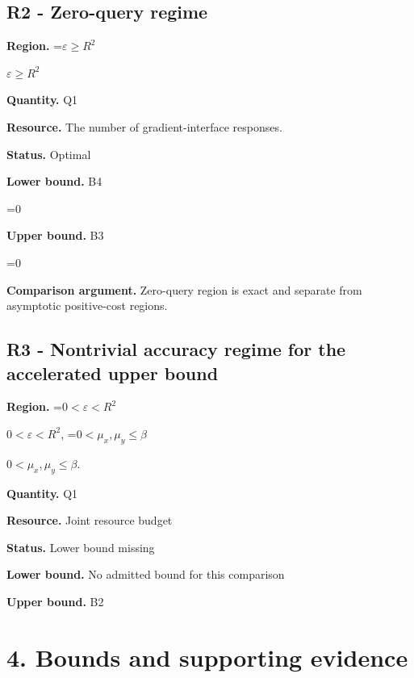 \documentclass[10pt,a4paper]{article}
\newcommand{\AtlasMath}[1]{\par\begingroup\centering\setbox0=\hbox{$\displaystyle #1$}\ifdim\wd0>1.4\linewidth\typeout{ATLAS WIDE FORMULA: \the\wd0}\fi\ifdim\wd0>\linewidth\resizebox{\linewidth}{!}{\box0}\else\box0\fi\par\endgroup}
\newcommand{\AtlasInlineMath}[1]{\begingroup\setbox0=\hbox{$#1$}\ifdim\wd0>.4\linewidth\endgroup\AtlasMath{#1}\else\endgroup$#1$\fi}
\begin{document}
\subsection{R2 - Zero-query regime}


\textbf{Region.} \AtlasInlineMath{\varepsilon\ge R^2}



\textbf{Quantity.} Q1



\textbf{Resource.} The number of gradient-interface responses.



\textbf{Status.} Optimal



\textbf{Lower bound.} B4



\AtlasMath{0}


\textbf{Upper bound.} B3



\AtlasMath{0}


\textbf{Comparison argument.} Zero-query region is exact and separate from asymptotic positive-cost regions.



\subsection{R3 - Nontrivial accuracy regime for the accelerated upper bound}


\textbf{Region.} \AtlasInlineMath{0<\varepsilon<R^2}, \AtlasInlineMath{0<\mu_x,\mu_y\le\beta}.



\textbf{Quantity.} Q1



\textbf{Resource.} Joint resource budget



\textbf{Status.} Lower bound missing



\textbf{Lower bound.} No admitted bound for this comparison



\textbf{Upper bound.} B2



\section{4. Bounds and supporting evidence}
\end{document}
